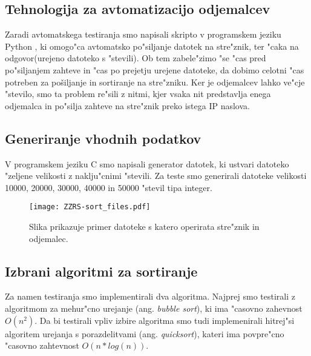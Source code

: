 \subsection{Tehnologija za avtomatizacijo odjemalcev}
Zaradi avtomatskega testiranja smo napisali skripto v programskem jeziku Python \cite{8_py}, ki omogo"ca avtomatsko po"siljanje datotek na stre"znik, ter "caka na odgovor(urejeno datoteko s "stevili). Ob tem zabele"zimo "se "cas pred po"siljanjem zahteve in "cas po prejetju urejene datoteke, da dobimo celotni "cas potreben za pošiljanje in sortiranje na stre"zniku. Ker je odjemalcev lahko ve"cje "stevilo, smo ta problem re"sili z nitmi, kjer vsaka nit predstavlja enega odjemalca in po"silja zahteve na stre"znik preko istega IP naslova.

\subsection{Generiranje vhodnih podatkov}
V programskem jeziku C smo napisali generator datotek, ki ustvari datoteko "zeljene velikosti z naklju"cnimi "stevili. Za teste smo generirali datoteke velikosti 10000, 20000, 30000, 40000 in 50000 "stevil tipa integer.

\begin{figure} [!h]
  \centering
    \texttt{[image: ZZRS-sort\_files.pdf]} 
  \caption{Slika prikazuje primer datoteke s katero operirata stre"znik in odjemalec.}
  \label{8_files}  
\end{figure}

\subsection{Izbrani algoritmi za sortiranje}
\label{8_izbira_algoritmov}
Za namen testiranja smo implementirali dva algoritma. Najprej smo testirali z algoritmom za mehur"cno urejanje (ang. \textit{bubble sort}), ki ima "casovno zahevnost $O(n^2)$.
Da bi testirali vpliv izbire algoritma smo tudi implemenirali hitrej"si algoritem urejanja s porazdelitvami (ang. \textit{quicksort}), kateri ima povpre"cno "casovno zahtevnost $O(n* log(n))$.



